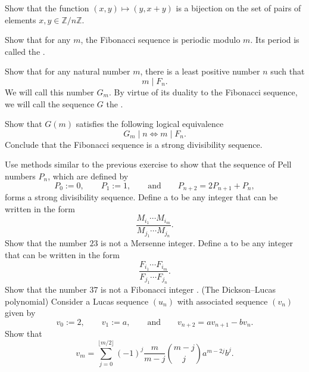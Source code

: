 \begin{challenge}
  \exercise
  \begin{subexenum}
  \item Show that the function $(x,y)\mapsto (y,x+y)$ is a bijection on the set of pairs of elements $x,y\in \mathbb{Z}/n\mathbb{Z}$.
  \item Show that for any $m$, the Fibonacci sequence is periodic modulo $m$. Its period is called the .
  \item Show that for any natural number $m$, there is a least positive number $n$ such that
    \begin{equation*}
      m\mid F_n.
    \end{equation*}
    We will call this number $G_m$. By virtue of its duality to the Fibonacci sequence, we will call the sequence $G$ the .
  \item Show that $G(m)$ satisfies the following logical equivalence
    \begin{equation*}
      G_m\mid n \Leftrightarrow m \mid F_n.
    \end{equation*}
    Conclude that the Fibonacci sequence is a strong divisibility sequence.
  \end{subexenum}
  \exercise Use methods similar to the previous exercise to show that the sequence of Pell numbers $P_n$, which are defined by
  \begin{equation*}
    P_0:=0,\qquad P_1:=1,\qquad\text{and}\qquad P_{n+2}=2P_{n+1}+P_{n},
  \end{equation*}
  forms a strong divisibility sequence.
  \exercise Define a  to be any integer that can be written in the form
  \begin{equation*}
    \frac{M_{i_1}\cdots M_{i_m}}{M_{j_1}\cdots M_{j_n}}.
  \end{equation*}
  Show that the number $23$ is not a Mersenne integer.
  \exercise Define a  to be any integer that can be written in the form
  \begin{equation*}
    \frac{F_{i_1}\cdots F_{i_m}}{F_{j_1}\cdots F_{j_n}}.
  \end{equation*}
  Show that the number $37$ is not a Fibonacci integer \cite{luca2003}.
  \exercise (The Dickson--Lucas polynomial) Consider a Lucas sequence $(u_n)$ with associated sequence $(v_n)$ given by
  \begin{equation*}
    v_0 := 2, \qquad v_1 := a,\qquad\text{and}\qquad v_{n+2}=av_{n+1}-bv_n.
  \end{equation*}
  Show that
  \begin{equation*}
    v_m = \sum_{j=0}^{\lfloor m/2 \rfloor} (-1)^j\frac{m}{m-j}\binom{m-j}{j} a^{m-2j}b^j.
  \end{equation*}
\end{challenge}

